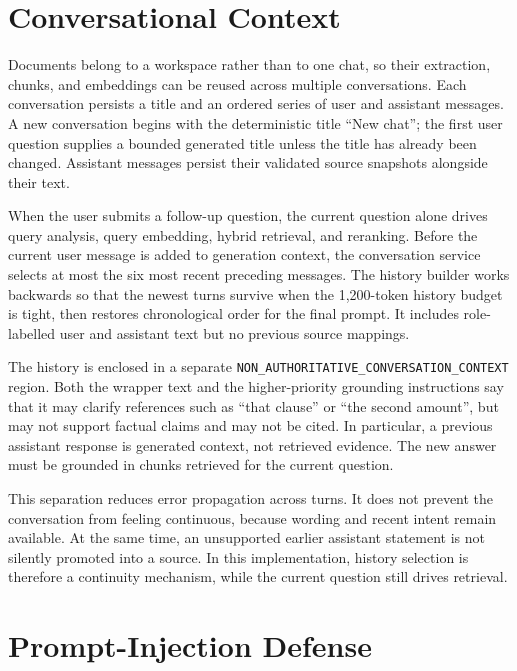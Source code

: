 \section{Conversational Context}
\label{sec:conversational-context}

Documents belong to a workspace rather than to one chat, so their extraction, chunks, and embeddings can be reused across multiple conversations. Each conversation persists a title and an ordered series of user and assistant messages. A new conversation begins with the deterministic title ``New chat''; the first user question supplies a bounded generated title unless the title has already been changed. Assistant messages persist their validated source snapshots alongside their text.

When the user submits a follow-up question, the current question alone drives query analysis, query embedding, hybrid retrieval, and reranking. Before the current user message is added to generation context, the conversation service selects at most the six most recent preceding messages. The history builder works backwards so that the newest turns survive when the 1,200-token history budget is tight, then restores chronological order for the final prompt. It includes role-labelled user and assistant text but no previous source mappings.

The history is enclosed in a separate \texttt{NON\_AUTHORITATIVE\_CONVERSATION\_CONTEXT} region. Both the wrapper text and the higher-priority grounding instructions say that it may clarify references such as ``that clause'' or ``the second amount'', but may not support factual claims and may not be cited. In particular, a previous assistant response is generated context, not retrieved evidence. The new answer must be grounded in chunks retrieved for the current question.

This separation reduces error propagation across turns. It does not prevent the conversation from feeling continuous, because wording and recent intent remain available. At the same time, an unsupported earlier assistant statement is not silently promoted into a source. In this implementation, history selection is therefore a continuity mechanism, while the current question still drives retrieval.

\section{Prompt-Injection Defense}
\label{sec:prompt-injection-defense}

